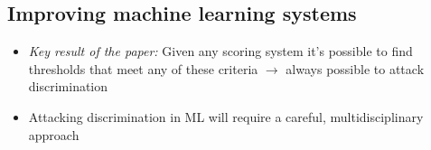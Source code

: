 \documentclass[12pt,a4paper]{article}
\begin{document}
\subsection{Improving machine learning systems}
\begin{itemize}
\item \textit{Key result of the paper:} Given any scoring system it's possible to find thresholds that meet any of these criteria \(\rightarrow\) always possible to attack discrimination
\item Attacking discrimination in ML will require a careful, multidisciplinary approach
\end{itemize}
\end{document}
